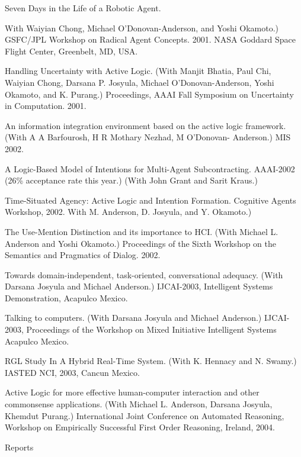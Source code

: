 \paper
Seven Days in the Life of a Robotic Agent. {With Waiyian Chong, Michael
O'Donovan-Anderson, and Yoshi Okamoto.)
GSFC/JPL Workshop on Radical Agent Concepts. 2001. NASA Goddard Space
Flight Center, Greenbelt, MD, USA. 

\paper
Handling Uncertainty with Active Logic. (With Manjit Bhatia, Paul Chi,
Waiyian Chong, Darsana P. Josyula, Michael O'Donovan-Anderson, Yoshi
Okamoto, and K. Purang.) Proceedings, AAAI Fall Symposium on
Uncertainty in Computation. 2001.

\paper
An information integration environment based on the active logic 
framework. (With A A Barfourosh, H R Mothary Nezhad, M O'Donovan-
Anderson.)  MIS 2002.

\paper
A Logic-Based Model of Intentions for Multi-Agent Subcontracting.
AAAI-2002 (26\% acceptance rate this year.) (With John
Grant and Sarit Kraus.)

\paper
Time-Situated Agency: Active Logic and Intention Formation.
Cognitive Agents Workshop, 2002.  With M. Anderson,
D. Josyula, and Y. Okamoto.)

\paper
The Use-Mention Distinction and its importance to {H}{C}{I}. (With Michael
L. Anderson and Yoshi Okamoto.) Proceedings of
the Sixth Workshop on the Semantics and Pragmatics of
Dialog. 2002.

\paper
Towards domain-independent, task-oriented, conversational
adequacy. (With Darsana Josyula and Michael Anderson.) IJCAI-2003,
Intelligent Systems Demonstration, Acapulco Mexico.

\paper
Talking to computers. (With Darsana Josyula and Michael Anderson.)
IJCAI-2003, Proceedings of the Workshop on Mixed Initiative
Intelligent Systems Acapulco Mexico.

\paper
RGL Study In A Hybrid Real-Time System. (With K. Hennacy and N. Swamy.)
IASTED NCI, 2003, Cancun Mexico.

\paper
Active Logic for more effective human-computer interaction and other
commonsense applications. 
(With Michael L. Anderson, Darsana Josyula, Khemdut Purang.)
International Joint Conference on Automated Reasoning,
Workshop on Empirically Successful First Order Reasoning, Ireland, 2004. 





\subsec Reports

}
